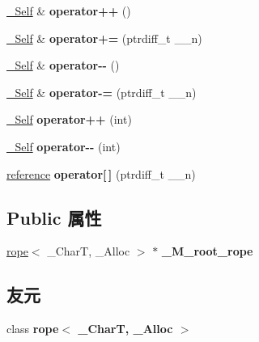 \begin{DoxyCompactItemize}
\hyperlink{class___rope__iterator__base}{\+\_\+\+Self} \& {\bfseries operator++} ()
\item 
\mbox{\label{class___rope__iterator_a85774bd71f9e536ec1dc3ee8a13b385d}} 
\hyperlink{class___rope__iterator__base}{\+\_\+\+Self} \& {\bfseries operator+=} (ptrdiff\+\_\+t \+\_\+\+\_\+n)
\item 
\mbox{\label{class___rope__iterator_a2960ffc6557b5adc00374d7f361438d6}} 
\hyperlink{class___rope__iterator__base}{\+\_\+\+Self} \& {\bfseries operator-\/-\/} ()
\item 
\mbox{\label{class___rope__iterator_a62b28d400cb063fcb301a7c10b2b45f5}} 
\hyperlink{class___rope__iterator__base}{\+\_\+\+Self} \& {\bfseries operator-\/=} (ptrdiff\+\_\+t \+\_\+\+\_\+n)
\item 
\mbox{\label{class___rope__iterator_a81750c7f979ff3b55d48cab5cd90bc5d}} 
\hyperlink{class___rope__iterator__base}{\+\_\+\+Self} {\bfseries operator++} (int)
\item 
\mbox{\label{class___rope__iterator_a4b49388c84ea665ec3dd3b7c54b7fb23}} 
\hyperlink{class___rope__iterator__base}{\+\_\+\+Self} {\bfseries operator-\/-\/} (int)
\item 
\mbox{\label{class___rope__iterator_ab6682c9300ffacd58067683d9287e337}} 
\hyperlink{class___rope__char__ref__proxy}{reference} {\bfseries operator\mbox{[}$\,$\mbox{]}} (ptrdiff\+\_\+t \+\_\+\+\_\+n)
\end{DoxyCompactItemize}
\subsection*{Public 属性}
\begin{DoxyCompactItemize}
\item 
\mbox{\label{class___rope__iterator_a3f5ae8654871ddf6e89faff5dcd4bfb0}} 
\hyperlink{classrope}{rope}$<$ \+\_\+\+CharT, \+\_\+\+Alloc $>$ $\ast$ {\bfseries \+\_\+\+M\+\_\+root\+\_\+rope}
\end{DoxyCompactItemize}
\subsection*{友元}
\begin{DoxyCompactItemize}
\item 
\mbox{\label{class___rope__iterator_a00faa722d619490e42c85e81ecdeba5e}} 
class {\bfseries rope$<$ \+\_\+\+Char\+T, \+\_\+\+Alloc $>$}
\end{DoxyCompactItemize}

